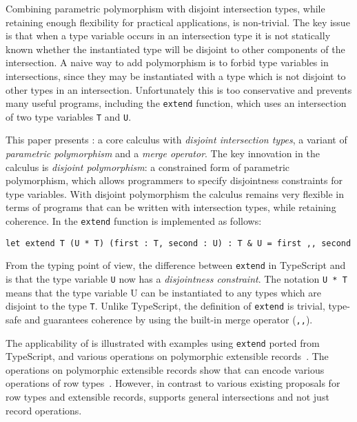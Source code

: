 Combining parametric polymorphism with disjoint intersection
types, while retaining enough flexibility for practical applications,
is non-trivial. The key issue is that when a type variable occurs in an intersection
type it is not statically known whether the instantiated type will
be disjoint to other components of the intersection.
A naive way  to add polymorphism is to forbid 
type variables in intersections, since they may be instantiated with 
a type which is not disjoint to other types in an intersection.
Unfortunately this is too conservative and prevents many useful 
programs, including the \lstinline{extend} function, which uses an
intersection of two type variables \lstinline{T} and \lstinline{U}. 


This paper presents \name: a core calculus with 
\emph{disjoint intersection types}, a variant of \emph{parametric polymorphism} and a
\emph{merge operator}. The key innovation in the calculus is \emph{disjoint polymorphism}: a
constrained form of parametric polymorphism, which allows programmers
to specify disjointness constraints for type variables. With disjoint
polymorphism the calculus remains very flexible in terms of programs
that can be written with intersection types, while retaining
coherence. In \name the \lstinline{extend} function is implemented
as follows:

\begin{lstlisting}
let extend T (U * T) (first : T, second : U) : T & U = first ,, second 
\end{lstlisting}

\noindent From the typing point of view, the difference between
\lstinline{extend} in TypeScript and \name is that the type variable
\lstinline{U} now has a \emph{disjointness constraint}. The notation
\lstinline{U * T} means that the type variable U can be instantiated
to any types which are disjoint to the type \lstinline{T}. Unlike
TypeScript, the definition of \lstinline{extend} is trivial, type-safe
and guarantees coherence by using the built-in merge operator (\lstinline{,,}). 

The applicability of \name is illustrated with examples using \lstinline{extend} 
ported from TypeScript, and various operations on polymorphic
extensible records~\cite{leijen2005extensible,harper1991record,jones99lightweight}. 
The operations on polymorphic extensible records
show that \name can encode various operations of row
types~\cite{wand1987complete}. However, in contrast to various existing proposals for 
row types and extensible records, \name supports general intersections 
and not just record operations.

